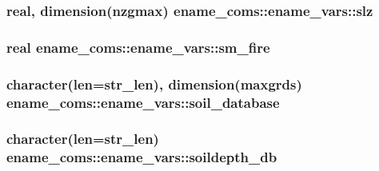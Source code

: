 \subsubsection[{slz}]{\setlength{\rightskip}{0pt plus 5cm}real, dimension(nzgmax) ename\+\_\+coms\+::ename\+\_\+vars\+::slz}\label{structename__coms_1_1ename__vars_a3b7099ca72d93440f24669d68dfb909e}
\hypertarget{structename__coms_1_1ename__vars_a14c833ccd73674a103a9163c607420cc}{}
\subsubsection[{sm\+\_\+fire}]{\setlength{\rightskip}{0pt plus 5cm}real ename\+\_\+coms\+::ename\+\_\+vars\+::sm\+\_\+fire}\label{structename__coms_1_1ename__vars_a14c833ccd73674a103a9163c607420cc}
\hypertarget{structename__coms_1_1ename__vars_aef86c476cff9cbcfe79082f1143233d6}{}
\subsubsection[{soil\+\_\+database}]{\setlength{\rightskip}{0pt plus 5cm}character(len=str\+\_\+len), dimension(maxgrds) ename\+\_\+coms\+::ename\+\_\+vars\+::soil\+\_\+database}\label{structename__coms_1_1ename__vars_aef86c476cff9cbcfe79082f1143233d6}
\hypertarget{structename__coms_1_1ename__vars_a7f495f9cd365ad7e341ee2bb4174715f}{}
\subsubsection[{soildepth\+\_\+db}]{\setlength{\rightskip}{0pt plus 5cm}character(len=str\+\_\+len) ename\+\_\+coms\+::ename\+\_\+vars\+::soildepth\+\_\+db}\label{structename__coms_1_1ename__vars_a7f495f9cd365ad7e341ee2bb4174715f}
\hypertarget{structename__coms_1_1ename__vars_ab3b1aab371445e20968cec38fb70740b}{}
